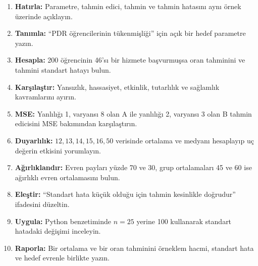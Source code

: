 \begin{enumerate}
\renewcommand{\labelenumi}{\textbf{\Alph{enumi}.}}
  \item \textbf{Hatırla:} Parametre, tahmin edici, tahmin ve tahmin hatasını aynı örnek üzerinde açıklayın.
  \item \textbf{Tanımla:} ``PDR öğrencilerinin tükenmişliği'' için açık bir hedef parametre yazın.
  \item \textbf{Hesapla:} 200 öğrencinin 46'sı bir hizmete başvurmuşsa oran tahminini ve tahmini standart hatayı bulun.
  \item \textbf{Karşılaştır:} Yansızlık, hassasiyet, etkinlik, tutarlılık ve sağlamlık kavramlarını ayırın.
  \item \textbf{MSE:} Yanlılığı 1, varyansı 8 olan A ile yanlılığı 2, varyansı 3 olan B tahmin edicisini MSE bakımından karşılaştırın.
  \item \textbf{Duyarlılık:} $12,13,14,15,16,50$ verisinde ortalama ve medyanı hesaplayıp uç değerin etkisini yorumlayın.
  \item \textbf{Ağırlıklandır:} Evren payları yüzde 70 ve 30, grup ortalamaları 45 ve 60 ise ağırlıklı evren ortalamasını bulun.
  \item \textbf{Eleştir:} ``Standart hata küçük olduğu için tahmin kesinlikle doğrudur'' ifadesini düzeltin.
  \item \textbf{Uygula:} Python benzetiminde $n=25$ yerine 100 kullanarak standart hatadaki değişimi inceleyin.
  \item \textbf{Raporla:} Bir ortalama ve bir oran tahminini örneklem hacmi, standart hata ve hedef evrenle birlikte yazın.
\end{enumerate}

